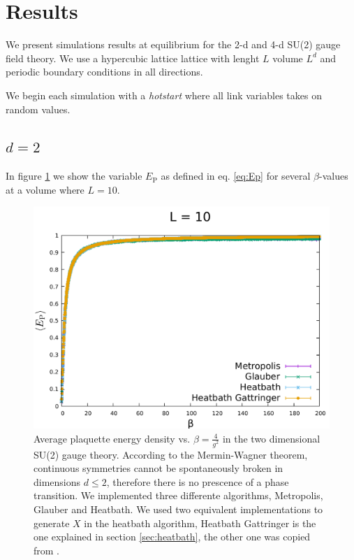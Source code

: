 \documentclass[12pt,a4paper]{article}
\begin{document}
\section{Results}

We present simulations results at equilibrium for the 2-d and 4-d SU(2) gauge field theory. We use a hypercubic lattice lattice with lenght $L$ volume $L^d$ and periodic boundary conditions in all directions.


We begin each simulation with a \textit{hotstart} where all link variables takes on random values.

\subsection{$d=2$}
In figure \ref{fig:L=10} we show the variable $E_{\text{P}}$ as defined in eq. \eqref{eq:Ep} for several $\beta$-values at a volume where $L=10$.

\begin{figure}
	\label{fig:L=10}
	\includegraphics[scale=0.6]{../images/L=10_metropolis_glauber_heatbaths_2000points.pdf}
	\caption{Average plaquette energy density vs. $\beta = \frac{4}{g^2}$ in the two dimensional SU(2) gauge theory. According to the Mermin-Wagner theorem, continuous symmetries cannot be spontaneously broken in dimensions $d\leq 2$, therefore there is no prescence of a phase transition. We implemented three differente algorithms, Metropolis, Glauber and Heatbath. We used two equivalent implementations to generate $X$ in the heatbath algorithm, Heatbath Gattringer is the one explained in section \ref{sec:heatbath}, the other one was copied from \cite{ricker}.}
\end{figure}
\end{document}
